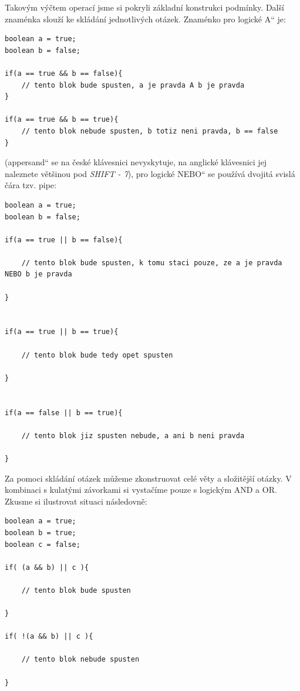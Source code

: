 \documentclass[10pt]{book}
\renewcommand\uv[1]{\quotedblbase #1\textquotedblleft}%
\newcommand{\klavesy}[1]{\textsc{\em #1}}
\begin{document}
Takovým výčtem operací jsme si pokryli základní konstrukci podmínky. Další znaménka slouží ke skládání jednotlivých otázek. Znaménko pro logické \uv{A} je:

\begin{lstlisting}
boolean a = true;
boolean b = false;

if(a == true && b == false){
	// tento blok bude spusten, a je pravda A b je pravda
}

if(a == true && b == true){
	// tento blok nebude spusten, b totiz neni pravda, b == false
}

\end{lstlisting}


(\uv{appersand} se na české klávesnici nevyskytuje, na anglické klávesnici jej naleznete většinou pod \klavesy {SHIFT - 7}), pro logické \uv{NEBO} se používá dvojitá svislá čára tzv. pipe:

\begin{lstlisting}
boolean a = true;
boolean b = false;

if(a == true || b == false){

	// tento blok bude spusten, k tomu staci pouze, ze a je pravda NEBO b je pravda

}


if(a == true || b == true){

	// tento blok bude tedy opet spusten

}


if(a == false || b == true){

	// tento blok jiz spusten nebude, a ani b neni pravda 

}

\end{lstlisting}

Za pomoci skládání otázek můžeme zkonstruovat celé věty a složitější otázky. V kombinaci s kulatými závorkami si vystačíme pouze s logickým AND a OR. Zkusme si ilustrovat situaci následovně:


\begin{lstlisting}
boolean a = true;
boolean b = true;
boolean c = false;

if( (a && b) || c ){

	// tento blok bude spusten
	
}

if( !(a && b) || c ){

	// tento blok nebude spusten
	
}

\end{lstlisting}
\end{document}
